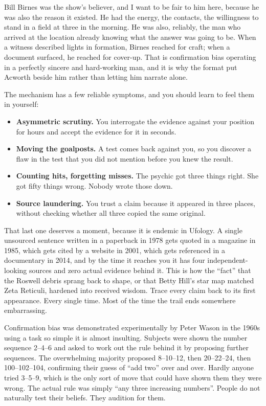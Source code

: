 Bill Birnes was the show's believer, and I want to be fair to him here, because he was also the
reason it existed. He had the energy, the contacts, the willingness to stand in a field at three in
the morning. He was also, reliably, the man who arrived at the location already knowing what the
answer was going to be. When a witness described lights in formation, Birnes reached for craft;
when a document surfaced, he reached for cover-up. That is confirmation bias operating in a
perfectly sincere and hard-working man, and it is why the format put Acworth beside him rather than
letting him narrate alone.

The mechanism has a few reliable symptoms, and you should learn to feel them in
yourself:

\begin{itemize}[leftmargin=1.4em,itemsep=2pt]
  \item \textbf{Asymmetric scrutiny.} You interrogate the evidence against your
  position for hours and accept the evidence for it in seconds.
  \item \textbf{Moving the goalposts.} A test comes back against you, so you
  discover a flaw in the test that you did not mention before you knew the result.
  \item \textbf{Counting hits, forgetting misses.} The psychic got three things
  right. She got fifty things wrong. Nobody wrote those down.
  \item \textbf{Source laundering.} You trust a claim because it appeared in three
  places, without checking whether all three copied the same original.
\end{itemize}

That last one deserves a moment, because it is endemic in Ufology. A single
unsourced sentence written in a paperback in 1978 gets quoted in a magazine in
1985, which gets cited by a website in 2001, which gets referenced in a documentary
in 2014, and by the time it reaches you it has four independent-looking sources and
zero actual evidence behind it. This is how the ``fact'' that the Roswell debris
sprang back to shape, or that Betty Hill's star map matched Zeta Reticuli, hardened
into received wisdom. Trace every claim back to its first appearance. Every single
time. Most of the time the trail ends somewhere embarrassing.

\begin{funfact}
Confirmation bias was demonstrated experimentally by Peter Wason in the 1960s using
a task so simple it is almost insulting. Subjects were shown the number sequence
2--4--6 and asked to work out the rule behind it by proposing further sequences. The
overwhelming majority proposed 8--10--12, then 20--22--24, then 100--102--104,
confirming their guess of ``add two'' over and over. Hardly anyone tried 3--5--9,
which is the only sort of move that could have shown them they were wrong. The
actual rule was simply ``any three increasing numbers''. People do not naturally
test their beliefs. They audition for them.
\end{funfact}

